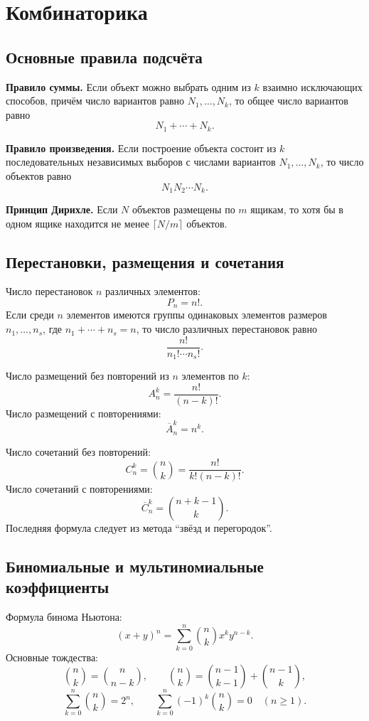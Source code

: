 \section{Комбинаторика}
\label{sec:combinatorics}

\subsection{Основные правила подсчёта}

\textbf{Правило суммы.} Если объект можно выбрать одним из $k$ взаимно
исключающих способов, причём число вариантов равно $N_1,\ldots,N_k$, то общее
число вариантов равно
\[
    N_1+\cdots+N_k.
\]

\textbf{Правило произведения.} Если построение объекта состоит из $k$
последовательных независимых выборов с числами вариантов $N_1,\ldots,N_k$, то
число объектов равно
\[
    N_1N_2\cdots N_k.
\]

\textbf{Принцип Дирихле.} Если $N$ объектов размещены по $m$ ящикам, то хотя бы
в одном ящике находится не менее $\lceil N/m\rceil$ объектов.

\subsection{Перестановки, размещения и сочетания}

Число перестановок $n$ различных элементов:
\[
    P_n=n!.
\]
Если среди $n$ элементов имеются группы одинаковых элементов размеров
$n_1,\ldots,n_s$, где $n_1+\cdots+n_s=n$, то число различных перестановок равно
\[
    \frac{n!}{n_1!\cdots n_s!}.
\]

Число размещений без повторений из $n$ элементов по $k$:
\[
    A_n^k=\frac{n!}{(n-k)!}.
\]
Число размещений с повторениями:
\[
    \overline{A}_n^k=n^k.
\]

Число сочетаний без повторений:
\[
    C_n^k=\binom{n}{k}=\frac{n!}{k!(n-k)!}.
\]
Число сочетаний с повторениями:
\[
    \overline{C}_n^k=\binom{n+k-1}{k}.
\]
Последняя формула следует из метода ``звёзд и перегородок''.

\subsection{Биномиальные и мультиномиальные коэффициенты}

Формула бинома Ньютона:
\[
    (x+y)^n=\sum_{k=0}^{n}\binom{n}{k}x^k y^{n-k}.
\]
Основные тождества:
\[
    \binom{n}{k}=\binom{n}{n-k},
    \qquad
    \binom{n}{k}=\binom{n-1}{k-1}+\binom{n-1}{k},
\]
\[
    \sum_{k=0}^{n}\binom{n}{k}=2^n,
    \qquad
    \sum_{k=0}^{n}(-1)^k\binom{n}{k}=0\quad(n\geq1).
\]

